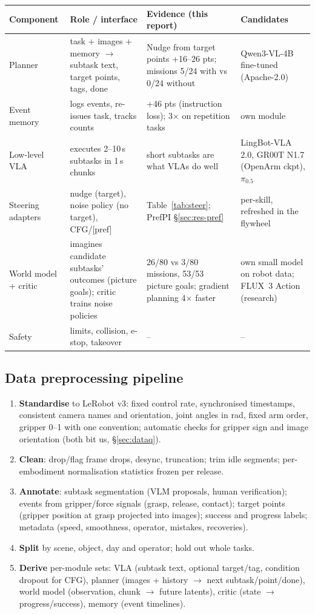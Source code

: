 \documentclass[10pt,a4paper]{article}
\newcommand{\pzf}{$\pi_{0.5}$}
\begin{document}
\begin{small}
\begin{longtable}{@{}P{2.4cm}P{4.3cm}P{4.6cm}P{3.6cm}@{}}
\toprule
\textbf{Component} & \textbf{Role / interface} & \textbf{Evidence (this report)} & \textbf{Candidates} \\
\midrule\endhead
Planner & task + images + memory $\rightarrow$ subtask text, target points, tags, done & Nudge from target points +16--26 pts; missions 5/24 with vs 0/24 without & Qwen3-VL-4B fine-tuned (Apache-2.0) \\
Event memory & logs events, re-issues task, tracks counts & +46 pts (instruction loss); 3$\times$ on repetition tasks & own module \\
Low-level VLA & executes 2--10\,s subtasks in 1\,s chunks & short subtasks are what VLAs do well & LingBot-VLA 2.0, GR00T N1.7 (OpenArm ckpt), \pzf \\
Steering adapters & nudge (target), noise policy (no target), CFG/[pref] & Table~\ref{tab:steer}; PrefPI \S\ref{sec:res-pref} & per-skill, refreshed in the flywheel \\
World model + critic & imagines candidate subtasks' outcomes (picture goals); critic trains noise policies & 26/80 vs 3/80 missions, 53/53 picture goals; gradient planning 4$\times$ faster & own small model on robot data; FLUX~3 Action (research) \\
Safety & limits, collision, e-stop, takeover & -- & -- \\
\bottomrule
\end{longtable}
\end{small}

\subsection{Data preprocessing pipeline}
\begin{enumerate}
\item \textbf{Standardise} to LeRobot v3: fixed control rate, synchronised timestamps, consistent camera names and orientation, joint angles in rad, fixed arm order, gripper 0--1 with one convention; automatic checks for gripper sign and image orientation (both bit us, \S\ref{sec:dataq}).
\item \textbf{Clean}: drop/flag frame drops, desync, truncation; trim idle segments; per-embodiment normalisation statistics frozen per release.
\item \textbf{Annotate}: subtask segmentation (VLM proposals, human verification); events from gripper/force signals (grasp, release, contact); target points (gripper position at grasp projected into images); success and progress labels; metadata (speed, smoothness, operator, mistakes, recoveries).
\item \textbf{Split} by scene, object, day and operator; hold out whole tasks.
\item \textbf{Derive} per-module sets: VLA (subtask text, optional target/tag, condition dropout for CFG), planner (images + history $\rightarrow$ next subtask/point/done), world model (observation, chunk $\rightarrow$ future latents), critic (state $\rightarrow$ progress/success), memory (event timelines).
\end{enumerate}
\end{document}
